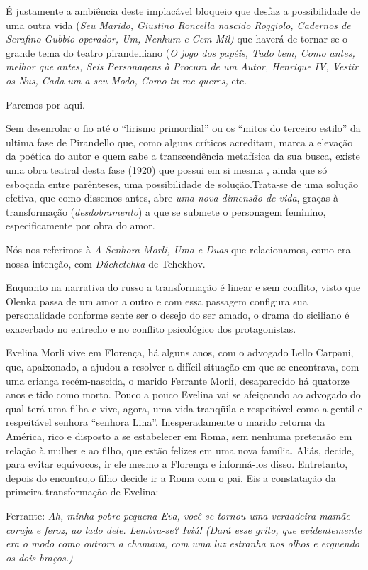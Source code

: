 É justamente a ambiência deste implacável bloqueio que desfaz a
possibilidade de uma outra vida (\emph{Seu Marido, Giustino Roncella
nascido Roggiolo, Cadernos de Serafino Gubbio operador, Um, Nenhum e Cem
Mil)} que haverá de tornar-se o grande tema do teatro pirandelliano
(\emph{O jogo dos papéis, Tudo bem, Como antes, melhor que antes, Seis
Personagens à Procura de um Autor, Henrique IV, Vestir os Nus, Cada um a
seu Modo, Como tu me queres,} etc.

Paremos por aqui.

Sem desenrolar o fio até o ``lirismo primordial'' ou os ``mitos do
terceiro estilo'' da ultima fase de Pirandello que, como alguns críticos
acreditam, marca a elevação da poética do autor e quem sabe a
transcendência metafísica da sua busca, existe uma obra teatral desta
fase (1920) que possui em si mesma , ainda que só esboçada entre
parênteses, uma possibilidade de solução.Trata-se de uma solução
efetiva, que como dissemos antes, abre \emph{uma nova dimensão de vida},
graças à transformação (\emph{desdobramento}) a que se submete o
personagem feminino, especificamente por obra do amor.

Nós nos referimos à \emph{A Senhora Morli, Uma e Duas} que relacionamos,
como era nossa intenção, com \emph{Dúchetchka} de Tchekhov.

Enquanto na narrativa do russo a transformação é linear e sem conflito,
visto que Olenka passa de um amor a outro e com essa passagem configura
sua personalidade conforme sente ser o desejo do ser amado, o drama do
siciliano é exacerbado no entrecho e no conflito psicológico dos
protagonistas.

Evelina Morli vive em Florença, há alguns anos, com o advogado Lello
Carpani, que, apaixonado, a ajudou a resolver a difícil situação em que
se encontrava, com uma criança recém-nascida, o marido Ferrante Morli,
desaparecido há quatorze anos e tido como morto. Pouco a pouco Evelina
vai se afeiçoando ao advogado do qual terá uma filha e vive, agora, uma
vida tranqüila e respeitável como a gentil e respeitável senhora
``senhora Lina''. Inesperadamente o marido retorna da América, rico e
disposto a se estabelecer em Roma, sem nenhuma pretensão em relação à
mulher e ao filho, que estão felizes em uma nova família. Aliás, decide,
para evitar equívocos, ir ele mesmo a Florença e informá-los disso.
Entretanto, depois do encontro,o filho decide ir a Roma com o pai. Eis a
constatação da primeira transformação de Evelina:

Ferrante: \emph{Ah, minha pobre pequena Eva, você se tornou uma
verdadeira mamãe coruja e feroz, ao lado dele. Lembra-se? Iviú! (Dará
esse grito, que evidentemente era o modo como outrora a chamava, com uma
luz estranha nos olhos e erguendo os dois braços.)}

